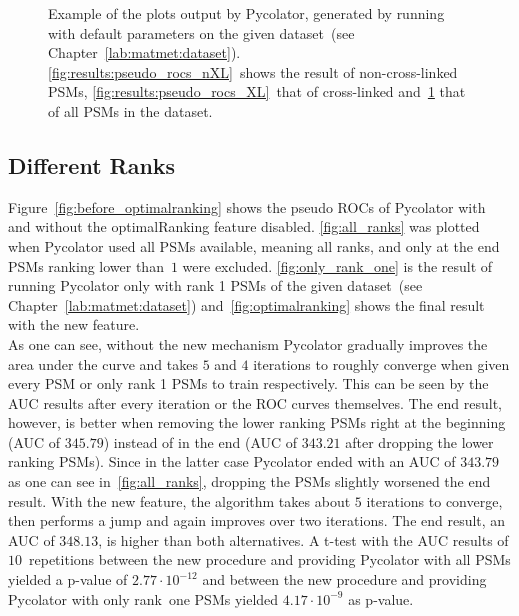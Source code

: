 \begin{figure}
\begin{subfigure}{0.49\textwidth}
		\caption{}
		\label{fig:results:pseudo_rocs_all}
	\end{subfigure}
	\caption[Examples of pseudo ROC curves as produced by Pycolator]{Example of the plots output by Pycolator, generated by running with default parameters on the given dataset~(see Chapter~\ref{lab:matmet:dataset}). \ref{fig:results:pseudo_rocs_nXL}~shows the result of non-cross-linked PSMs, \ref{fig:results:pseudo_rocs_XL}~that of cross-linked and~\ref{fig:results:pseudo_rocs_all} that of all PSMs in the dataset.}
	\label{fig:results:pseudo_rocs}
\end{figure}
\renewcommand{\baselinestretch}{1}

\subsection{Different Ranks}
\label{lab:results:ranks}
Figure~\ref{fig:before_optimalranking} shows the pseudo ROCs of Pycolator with and without the optimalRanking feature disabled. \ref{fig:all_ranks} was plotted when Pycolator used all PSMs available, meaning all ranks, and only at the end PSMs ranking lower than~$1$ were excluded. \ref{fig:only_rank_one} is the result of running Pycolator only with rank 1 PSMs of the given dataset~(see Chapter~\ref{lab:matmet:dataset}) and~\ref{fig:optimalranking} shows the final result with the new feature.\\
As one can see, without the new mechanism Pycolator gradually improves the area under the curve and takes $5$ and $4$ iterations to roughly converge when given every PSM or only rank 1 PSMs to train respectively. This can be seen by the AUC results after every iteration or the ROC curves themselves. The end result, however, is better when removing the lower ranking PSMs right at the beginning (AUC of $345.79$) instead of in the end (AUC of $343.21$ after dropping the lower ranking PSMs). Since in the latter case Pycolator ended with an AUC of $343.79$ as one can see in~\ref{fig:all_ranks}, dropping the PSMs slightly worsened the end result. With the new feature, the algorithm takes about $5$ iterations to converge, then performs a jump and again improves over two iterations. The end result, an AUC of $348.13$, is higher than both alternatives. A t-test with the AUC results of $10$~repetitions between the new procedure and providing Pycolator with all PSMs yielded a p-value of $2.77\cdot10^{-12}$ and between the new procedure and providing Pycolator with only rank~one PSMs yielded $4.17\cdot10^{-9}$ as p-value.
\renewcommand{\baselinestretch}{0.9}
